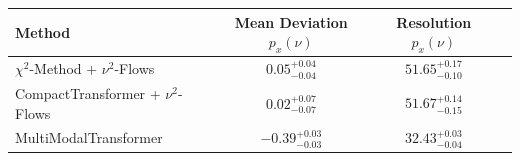     \begin{tabular}{lccc}
        \toprule
        Method & Mean Deviation $p_{x}(\nu)$ & Resolution $p_{x}(\nu)$ \\
        \midrule
        $\chi^2$-Method + $\nu^2$-Flows & $0.05^{+0.04}_{-0.04}$ & $51.65^{+0.17}_{-0.10}$ \\
        CompactTransformer + $\nu^2$-Flows & $0.02^{+0.07}_{-0.07}$ & $51.67^{+0.14}_{-0.15}$ \\
        MultiModalTransformer & $-0.39^{+0.03}_{-0.03}$ & $32.43^{+0.03}_{-0.04}$ \\
        \bottomrule
    \end{tabular}